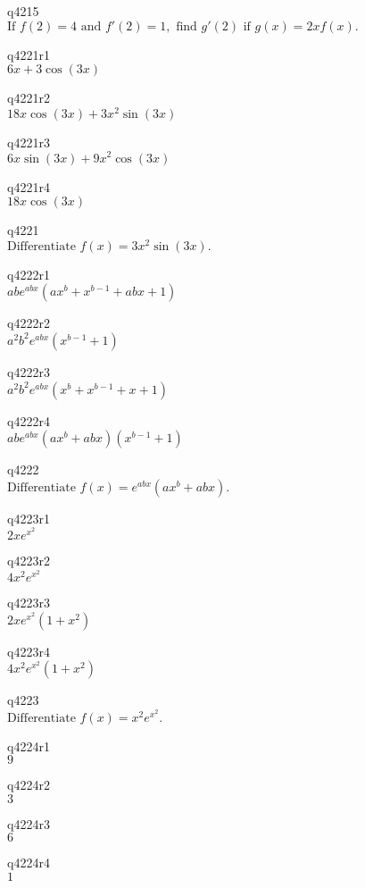 q4215\\
\(\displaystyle \text{If } f(2) = 4 \text{ and } f'(2) = 1, \text{ find } g'(2) \text{ if } g(x) = 2xf(x). \)

q4221r1\\
\(\displaystyle 6x + 3\cos(3x) \)

q4221r2\\
\(\displaystyle 18x\cos(3x) + 3x^2\sin(3x) \)

q4221r3\\
\(\displaystyle 6x\sin(3x) + 9x^2\cos(3x) \)

q4221r4\\
\(\displaystyle 18x\cos(3x) \)

q4221\\
\(\displaystyle \text{Differentiate } f(x) = 3x^2 \sin(3x). \)

q4222r1\\
\(\displaystyle abe^{abx} (ax^b + x^{b-1} + abx + 1) \)

q4222r2\\
\(\displaystyle a^2b^2e^{abx}(x^{b-1} + 1) \)

q4222r3\\
\(\displaystyle a^2 b^2 e^{abx} (x^b + x^{b-1} + x + 1) \)

q4222r4\\
\(\displaystyle abe^{abx} (ax^b + abx)(x^{b-1} + 1) \)

q4222\\
\(\displaystyle \text{Differentiate } f(x) = e^{abx} (ax^b + abx). \)

q4223r1\\
\(\displaystyle 2xe^{x^2} \)

q4223r2\\
\(\displaystyle 4x^2 e^{x^2} \)

q4223r3\\
\(\displaystyle 2x e^{x^2} (1+x^2) \)

q4223r4\\
\(\displaystyle 4x^2 e^{x^2} (1+x^2) \)

q4223\\
\(\displaystyle \text{Differentiate } f(x) = x^2 e^{x^2}. \)

q4224r1\\
\(\displaystyle 9 \)

q4224r2\\
\(\displaystyle 3 \)

q4224r3\\
\(\displaystyle 6 \)

q4224r4\\
\(\displaystyle 1 \)

